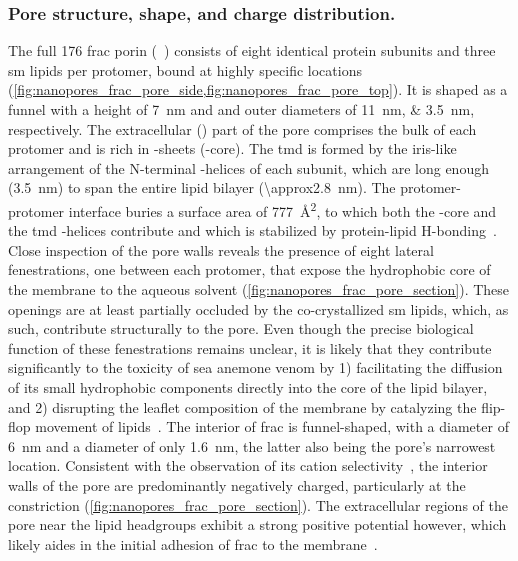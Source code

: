 \subsubsection{Pore structure, shape, and charge distribution.}

The full \SI{176}{\kDa} \Gls{frac} porin (~\cite{Tanaka-2015}) consists of eight identical protein
subunits and three \gls{sm} lipids per protomer, bound at highly specific locations
(\cref{fig:nanopores_frac_pore_side,fig:nanopores_frac_pore_top}). It is shaped as a funnel with a height of
\SI{7}{\nm} and \cisi{} and \transi{} outer diameters of \SIlist{11;3.5}{\nm}, respectively. The extracellular
(\cisi) part of the pore comprises the bulk of each protomer and is rich in \tb-sheets (\tb-core). The
\gls{tmd} is formed by the iris-like arrangement of the N-terminal \ta-helices of each subunit, which are long
enough (\SI{3.5}{\nm}) to span the entire lipid bilayer (\SI{\approx2.8}{\nm}). The protomer-protomer
interface buries a surface area of \SI{777}{\square\angstrom}, to which both the \tb-core and the \gls{tmd}
\ta-helices contribute and which is stabilized by protein-lipid H-bonding~\cite{Tanaka-2015}. Close inspection
of the pore walls reveals the presence of eight lateral fenestrations, one between each protomer, that expose
the hydrophobic core of the membrane to the aqueous solvent (\cref{fig:nanopores_frac_pore_section}). These
openings are at least partially occluded by the co-crystallized \gls{sm} lipids, which, as such, contribute
structurally to the pore. Even though the precise biological function of these fenestrations remains unclear,
it is likely that they contribute significantly to the toxicity of sea anemone venom by 1) facilitating the
diffusion of its small hydrophobic components directly into the core of the lipid bilayer, and 2) disrupting
the leaflet composition of the membrane by catalyzing the flip-flop movement of lipids~\cite{Tanaka-2015}. The
interior of \gls{frac} is funnel-shaped, with a \cisi{} diameter of \SI{6}{\nm} and a \trans{} diameter of
only \SI{1.6}{\nm}, the latter also being the pore's narrowest location. Consistent with the observation of
its cation selectivity~\cite{Garcia-Ortega-2011,Wloka-2016}, the interior walls of the pore are predominantly
negatively charged, particularly at the \transi{} constriction (\cref{fig:nanopores_frac_pore_section}). The
extracellular regions of the pore near the lipid headgroups exhibit a strong positive potential however, which
likely aides in the initial adhesion of \gls{frac} to the membrane~\cite{Tanaka-2015}.

